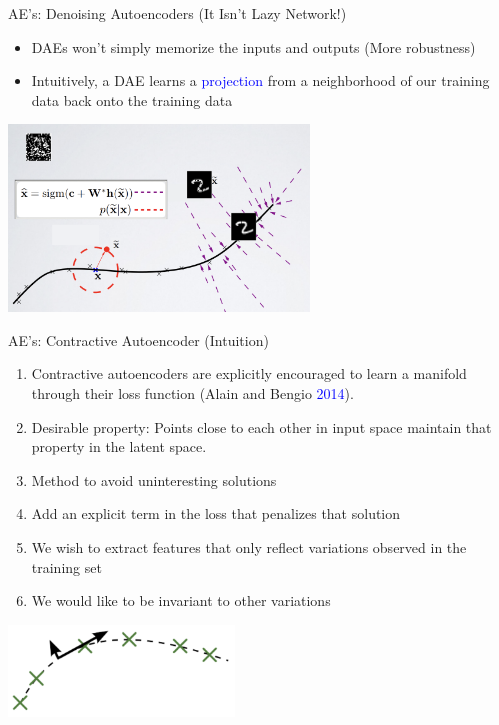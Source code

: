 \documentclass[serif, aspectratio=169]{beamer}
\begin{document}
\begin{frame}{AE’s: Denoising Autoencoders (It Isn’t Lazy Network!)}
    \begin{itemize}
        \item  DAEs won’t simply memorize the inputs and outputs (More robustness)
        \item Intuitively, a DAE learns a \textcolor{blue}{projection} from a neighborhood of our training data back onto the training data 
    \end{itemize}

    \begin{center}
        \includegraphics[width=0.6\textwidth]{pic/DAE not lazy3.png}
    \end{center}
\end{frame}

\begin{frame}{AE’s: Contractive Autoencoder (Intuition)}
    \small
    \begin{enumerate}
        \item Contractive autoencoders are explicitly encouraged to learn a manifold through their loss function (Alain and Bengio \textcolor{blue}{2014}).
        \item \textcolor{deepgreen}{Desirable property:} Points close to each other in input space maintain that property in the latent space.
        \item Method to avoid uninteresting solutions
        \item Add an explicit term in the loss that penalizes that solution
        \item We wish to extract features that only reflect variations observed in the training set
        \item We would like to be invariant to other variations
    \end{enumerate}
    
    
    \begin{center}
        \includegraphics[width=0.45\textwidth]{pic/CAE Intuition1.png} 
    \end{center}
    \vspace{0.4cm}

\end{frame}
\end{document}
